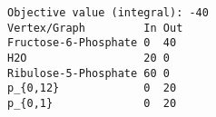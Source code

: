 \begin{verbatim}
Objective value (integral): -40
Vertex/Graph         In Out 
Fructose-6-Phosphate 0  40  
H2O                  20 0   
Ribulose-5-Phosphate 60 0   
p_{0,12}             0  20  
p_{0,1}              0  20  
\end{verbatim}
